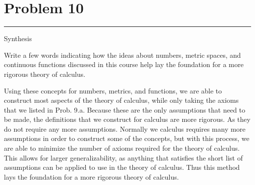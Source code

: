 \documentclass[12pt]{amsart}
\newcommand{\usec}[1]{%
\section*{#1}%
\noindent\rule{\textwidth}{2pt}%
\vspace{10pt}%
}
\newcommand{\gtodo}[1]{\todo[inline, color=green]{#1}}
\newcommand{\prob}[1]{Prob. #1}
\begin{document}
\gtodo{More?}

\usec{Problem 10}%
\label{sec:problem_10}

Synthesis

Write a few words indicating how the ideas about numbers, metric spaces, and
continuous functions discussed in this course help lay the foundation for a
more rigorous theory of calculus.

Using these concepts for numbers, metrics, and functions, we are able to
construct most aspects of the theory of calculus, while only taking the axioms
that we listed in \prob{9.a}. Because these are the only assumptions that need
to be made, the definitions that we construct for calculus are more rigorous.
As they do not require any more assumptions. Normally we calculus requires many
more assumptions in order to construct some of the concepts, but with this
process, we are able to minimize the number of axioms required for the theory
of calculus. This allows for larger generalizability, as anything that
satisfies the short list of assumptions can be applied to use in the theory of
calculus. Thus this method lays the foundation for a more rigorous theory of
calculus.

\gtodo{Write More?}
\end{document}
